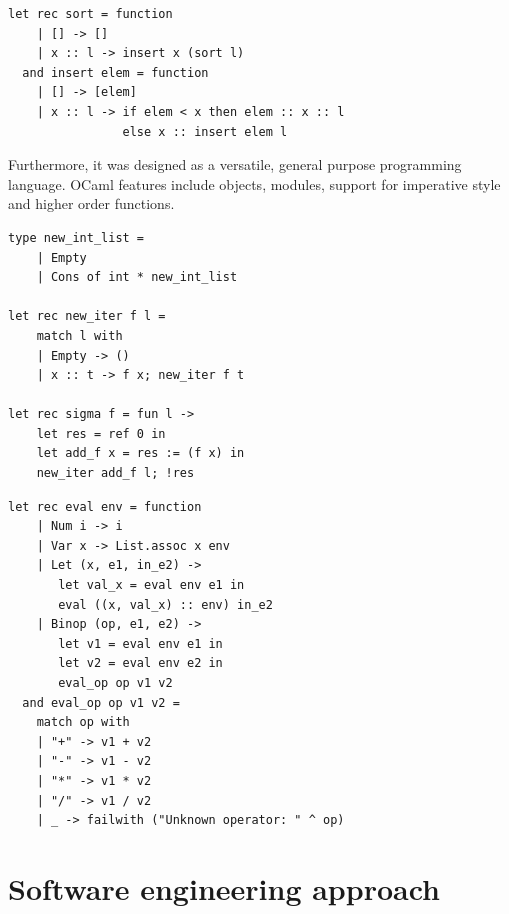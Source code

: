 \documentclass[12pt,twoside,notitlepage]{report}
\begin{document}
\begin{minipage}{\linewidth}

\begin{lstlisting}[caption={OCaml complex function example: insertion sort}]
let rec sort = function
    | [] -> []
    | x :: l -> insert x (sort l)
  and insert elem = function
    | [] -> [elem]
    | x :: l -> if elem < x then elem :: x :: l
                else x :: insert elem l
\end{lstlisting}

\end{minipage}

Furthermore, it was designed as a versatile, general purpose programming language. OCaml features include objects, modules, support for imperative style and higher order functions.
\vspace{3mm}

\begin{minipage}{\linewidth}

\begin{lstlisting}[caption={OCaml imperative function example}]
type new_int_list =
    | Empty
    | Cons of int * new_int_list
    
let rec new_iter f l = 
	match l with 
	| Empty -> ()
	| x :: t -> f x; new_iter f t

let rec sigma f = fun l -> 
    let res = ref 0 in 
    let add_f x = res := (f x) in 
    new_iter add_f l; !res
\end{lstlisting}

\end{minipage}

    
\begin{minipage}{\linewidth}

\begin{lstlisting}[caption={OCaml evaluation function example}]    
let rec eval env = function
    | Num i -> i
    | Var x -> List.assoc x env
    | Let (x, e1, in_e2) ->
       let val_x = eval env e1 in
       eval ((x, val_x) :: env) in_e2
    | Binop (op, e1, e2) ->
       let v1 = eval env e1 in
       let v2 = eval env e2 in
       eval_op op v1 v2
  and eval_op op v1 v2 =
    match op with
    | "+" -> v1 + v2
    | "-" -> v1 - v2
    | "*" -> v1 * v2
    | "/" -> v1 / v2
    | _ -> failwith ("Unknown operator: " ^ op)
\end{lstlisting}

\end{minipage}

\section{Software engineering approach}
\end{document}
